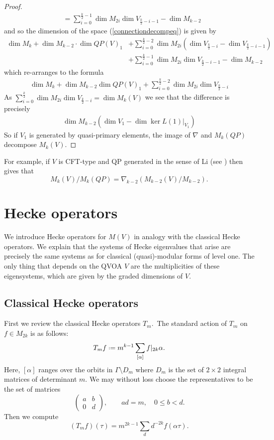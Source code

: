 \documentclass[12pt]{amsart}
\theoremstyle{plain}
\theoremstyle{definition}
\theoremstyle{remark}
\newcommand*{\df}{\mathrel{\vcenter{\baselineskip0.5ex \lineskiplimit0pt
                     \hbox{\scriptsize.}\hbox{\scriptsize.}}} =}
\providecommand{\twomat}[4]{\left(\begin{matrix}#1&#2\\#3&#4\end{matrix}\right)}
\begin{document}
\begin{proof}
\begin{align*}
    &= \sum_{i=0}^{\frac{k}{2}-1}\dim M_{2i}\dim V_{\frac{k}{2}-i-1}-\dim M_{k-2}
\end{align*}
and so the dimension of the space (\ref{connectiondecompeq}) is given by
\begin{align*}
    \dim M_k+\dim M_{k-2} \cdot \dim QP(V)_1&+\sum_{i=0}^{\frac{k}{2}-2}\dim M_{2i}(\dim V_{\frac{k}{2}-i}-\dim V_{\frac{k}{2}-i-1}) \\
&+\sum_{i=0}^{\frac{k}{2}-1}\dim M_{2i}\dim V_{\frac{k}{2}-i-1}-\dim M_{k-2}
\end{align*}
which re-arranges to the formula
\begin{align*}
\dim M_k+\dim M_{k-2}\dim QP(V)_1+\sum_{i=0}^{\frac{k}{2}-2}\dim M_{2i}\dim V_{\frac{k}{2}-i}
\end{align*}
As $\sum_{i=0}^{\frac{k}{2}}\dim M_{2i}\dim V_{\frac{k}{2}-i}=\dim M_k(V)$ we see that the difference is precisely
\begin{align*}
    \dim M_{k-2}(\dim V_1-\dim \ker L(1)\vert_{V_1})
\end{align*}
So if $V_1$ is generated by quasi-primary elements, the image of $\nabla$ and $M_k(QP)$ decompose $M_k(V)$.
\end{proof}
For example, if $V$ is CFT-type and QP generated in the sense of Li (see \cite{LiInvariant}) then \cite[page 10]{DLMsl2} gives that
\[ M_k(V)/M_k(QP)=\nabla_{k-2}(M_{k-2}(V)/M_{k-2}).\]
 

\section{Hecke operators}
\label{s:hecke}
We introduce Hecke operators for $M(V)$ in analogy with the classical Hecke operators. We explain that the systems of Hecke eigenvalues that arise are precisely the same systems as for classical (quasi)-modular forms of level one. The only thing that depends on the QVOA $V$ are the multiplicities of these eigensystems, which are given by the graded dimensions of $V$.

\subsection{Classical Hecke operators}
First we review the classical Hecke operators $T_m$.\
The standard action of $T_m$ on $f\in M_{2k}$ is as follows:
$$T_mf\df m^{k-1}\sum_{[\alpha]} f|_{2k}\alpha.$$
Here, $[\alpha]$ ranges over the orbits in $\Gamma \setminus{D_m}$ where $D_m$ is the set of $2\times 2$ integral matrices of determinant $m$.  We may without loss choose the representatives to be the set of matrices 
$$\twomat ab0d,\quad\quad ad=m,\quad 0\leq b < d.$$
Then we compute
\[
(T_mf)(\tau)
 =m^{2k-1}\sum_d d^{-2k}f(\alpha\tau).
\]
\end{document}
